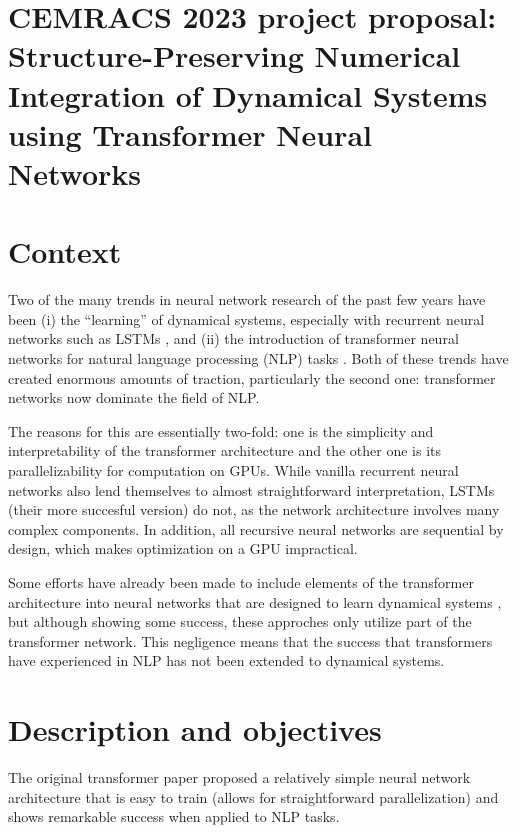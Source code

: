 \documentclass{article}
\begin{document}
{%
\section*{CEMRACS 2023 project proposal: Structure-Preserving Numerical Integration of Dynamical Systems using Transformer Neural Networks}
}


\section{Context}

Two of the many trends in neural network research of the past few years have been (i) the ``learning'' of dynamical systems, especially with recurrent neural networks such as LSTMs \cite{wang2017new, gonzalez2018non, xue2020lstm}, and (ii) the introduction of transformer neural networks for natural language processing (NLP) tasks \cite{vaswani2017attention}. Both of these trends have created enormous amounts of traction, particularly the second one: transformer networks now dominate the field of NLP. 

The reasons for this are essentially two-fold: one is the simplicity and interpretability of the transformer architecture and the other one is its parallelizability for computation on GPUs. While vanilla recurrent neural networks also lend themselves to almost straightforward interpretation, LSTMs (their more succesful version) do not, as the network architecture involves many complex components.
In addition, all recursive neural networks are sequential by design, which makes optimization on a GPU impractical.    

Some efforts have already been made to include elements of the transformer architecture into neural networks that are designed to learn dynamical systems \cite{shalova2020tensorized, geneva2022transformers}, but although showing some success, these approches only utilize part of the transformer network. This negligence means that the success that transformers have experienced in NLP has not been extended to dynamical systems. 

\section{Description and objectives}

The original transformer paper \cite{vaswani2017attention} proposed a relatively simple neural network architecture that is easy to train (allows for straightforward parallelization) and shows remarkable success when applied to NLP tasks. 
\end{document}
